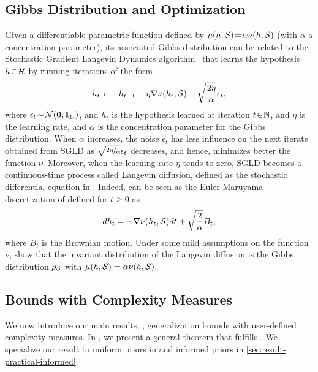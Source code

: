 \documentclass[twoside]{article}
\theoremstyle{plain}
\begin{document}
\subsection{Gibbs Distribution and Optimization}
\label{sec:gibbs-optim}

Given a differentiable parametric function defined by $\operatorname{\mu}(h,\mathcal{S})\!=\!\alpha\nu(h,\mathcal{S})$ (with $\alpha$ a concentration parameter), its associated Gibbs distribution can be related to the Stochastic Gradient Langevin Dynamics algorithm~\citep[SGLD,][]{welling2011bayesian} that learns the hypothesis $h\!\in\!\mathcal{H}$ by running iterations of the form 
\begin{align}
    h_t \longleftarrow h_{t-1} - \eta\nabla\nu(h_t,\mathcal{S}) + \sqrt{\frac{2\eta}{\alpha}}\epsilon_t, \label{eq:sgld}
\end{align}
where $\epsilon_t\!\sim\!\mathcal{N}({\mathbf 0}, \mathbf{I}_D)$, and $h_t$ is the hypothesis learned at iteration $t\!\in\!\mathbb{N}$, and $\eta$ is the learning rate, and $\alpha$ is the concentration parameter for the Gibbs distribution.
When $\alpha$ increases, the noise $\epsilon_t$ has less influence on the next iterate obtained from SGLD as $\sqrt{\nicefrac{2\eta}{\alpha}}\epsilon_t$ decreases, and hence, minimizes better the function $\nu$.
Moreover, when the learning rate $\eta$ tends to zero, SGLD  becomes a continuous-time process called Langevin diffusion, defined as the stochastic differential equation in .
Indeed,  can be seen as the Euler-Maruyama discretization \citep[see,][]{raginsky2017nonconvex} of  defined for $t\ge 0$ as
\begin{align}
    dh_t = -\nabla \nu(h_t, \mathcal{S})dt + \sqrt{\frac{2}{\alpha}}B_t,\label{eq:sgld-2}
\end{align}
where $B_t$ is the Brownian motion.
Under some mild assumptions on the function $\nu$, \citet{chiang1987diffusion} show that the invariant distribution of the Langevin diffusion is the Gibbs distribution $\rho_{\mathcal{S}}$ with $\operatorname{\mu}(h,\mathcal{S})=\alpha\nu(h,\mathcal{S})$.

\subsection{Bounds with Complexity Measures}
\label{sec:result}

We now introduce our main results, \ie, generalization bounds with user-defined complexity measures. 
In , we present a general theorem that fulfills .
We specialize our result to uniform priors in  and informed priors in \cref{sec:result-practical-informed}.
\end{document}
